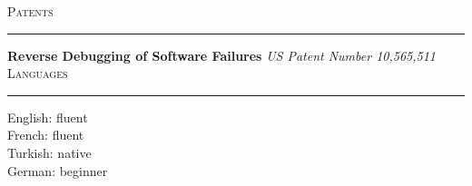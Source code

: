 \documentclass[10pt]{article}
\newcommand{\mysec}[1]{\vspace{2em}\textsc{\large #1}\vspace{1mm}\hrule\vspace{2mm}}
\newcommand{\mysub}[3]{\textbf{#1} {#2} \hfill {\em #3}}
\newcommand{\myssub}[1]{\hspace*{2mm}\parbox{163mm}{#1}\vspace*{2mm}}
\begin{document}



\mysec{Patents}
\mysub{Reverse Debugging of Software Failures}{}{\rm US Patent Number 10,565,511\vspace{2mm}} \\

\mysec{Languages}


\myssub{English: fluent \\
French: fluent \\
Turkish: native \\
German: beginner}\\


\end{document}
